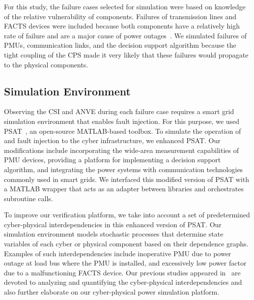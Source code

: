\documentclass[review]{elsarticle}
\begin{document}
For this study, the failure cases selected for simulation were based on knowledge of the relative vulnerability of components. Failures of transmission lines and FACTS devices were included because both components have a relatively high rate of failure and are a major cause of power outages~\cite{OE417,SoW13}. We simulated failures of PMUs, communication links, and the decision support algorithm because the tight coupling of the CPS made it very likely that these failures would propagate to the physical components.

\subsection{Simulation Environment}
\label{sec:case_study:sim}
Observing the CSI and ANVE during each failure case requires a smart grid simulation environment that enables fault injection. For this purpose, we used PSAT~\cite{Mi05}, an open-source MATLAB-based toolbox. To simulate the operation of and fault injection to the cyber infrastructure, we enhanced PSAT. Our modifications include incorporating the wide-area measurement capabilities of PMU devices, providing a platform for implementing a decision support algorithm, and integrating the power systems with communication technologies commonly used in smart grids. We interfaced this modified version of PSAT with a MATLAB wrapper that acts as an adapter between libraries and orchestrates subroutine calls.

To improve our verification platform, we take into account a set of predetermined cyber-physical interdependencies in this enhanced version of PSAT. Our simulation environment models stochastic processes that determine state variables of each cyber or physical component based on their dependence graphs. Examples of such interdependencies include inoperative PMU due to power outage at load bus where the PMU is installed, and excessively low power factor due to a malfunctioning FACTS device. Our previous studies appeared in~\cite{MaS16,MaS18} are devoted to analyzing and quantifying the cyber-physical interdependencies and also further elaborate on our cyber-physical power simulation platform.
\end{document}
